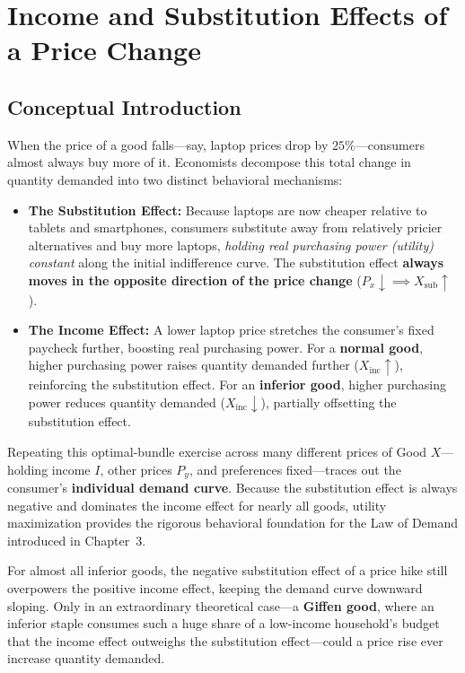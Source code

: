 \documentclass[11pt,letterpaper]{article}
\begin{document}
\section{Income and Substitution Effects of a Price Change}

\subsection*{Conceptual Introduction}
When the price of a good falls—say, laptop prices drop by $25\%$—consumers almost always buy more of it. Economists decompose this total change in quantity demanded into two distinct behavioral mechanisms:
\begin{itemize}
    \item \textbf{The Substitution Effect:} Because laptops are now cheaper relative to tablets and smartphones, consumers substitute away from relatively pricier alternatives and buy more laptops, \emph{holding real purchasing power (utility) constant} along the initial indifference curve. The substitution effect \textbf{always moves in the opposite direction of the price change} ($P_x \downarrow \implies X_{\text{sub}} \uparrow$).
    \item \textbf{The Income Effect:} A lower laptop price stretches the consumer's fixed paycheck further, boosting real purchasing power. For a \textbf{normal good}, higher purchasing power raises quantity demanded further ($X_{\text{inc}} \uparrow$), reinforcing the substitution effect. For an \textbf{inferior good}, higher purchasing power reduces quantity demanded ($X_{\text{inc}} \downarrow$), partially offsetting the substitution effect.
\end{itemize}

Repeating this optimal-bundle exercise across many different prices of Good $X$—holding income $I$, other prices $P_y$, and preferences fixed—traces out the consumer's \textbf{individual demand curve}. Because the substitution effect is always negative and dominates the income effect for nearly all goods, utility maximization provides the rigorous behavioral foundation for the Law of Demand introduced in Chapter~3.

\begin{tcolorbox}[colback=LightTerracotta,colframe=CourseOrange,title=\textbf{Clear It Up: What Is a Giffen Good?}]
For almost all inferior goods, the negative substitution effect of a price hike still overpowers the positive income effect, keeping the demand curve downward sloping. Only in an extraordinary theoretical case—a \textbf{Giffen good}, where an inferior staple consumes such a huge share of a low-income household's budget that the income effect outweighs the substitution effect—could a price rise ever increase quantity demanded.
\end{tcolorbox}
\end{document}
